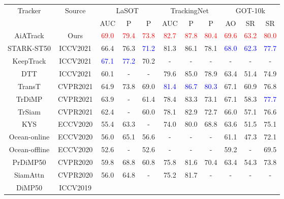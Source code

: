 \documentclass[runningheads]{llncs}
\begin{document}
\begin{table}[t]
\centering
\begin{tabular}{c|c|ccc|ccc|ccc}
\hline
\multirow{2}{*}{Tracker}
& \multirow{2}{*}{Source}
& \multicolumn{3}{c|}{LaSOT \cite{fan2019lasot}}
& \multicolumn{3}{c|}{TrackingNet \cite{muller2018trackingnet}}
& \multicolumn{3}{c}{GOT-10k \cite{huang2019got}} \\
& & AUC & P & \multicolumn{1}{c|}{P}
& AUC & P & \multicolumn{1}{c|}{P}
& AO & SR & SR \\
\hline
AiATrack & Ours & 
\textcolor{red}{69.0} & \textcolor{red}{79.4} & \textcolor{red}{73.8} & 
\textcolor{red}{82.7} & \textcolor{red}{87.8} & \textcolor{red}{80.4} & 
\textcolor{red}{69.6} & \textcolor{red}{63.2} & \textcolor{red}{80.0} \\
STARK-ST50 \cite{yan2021learning} & ICCV2021 & 
66.4 & 76.3 & \textcolor{blue}{71.2} & 81.3 & 86.1 & 78.1 & \textcolor{blue}{68.0} & \textcolor{blue}{62.3} & \textcolor{blue}{77.7} \\
KeepTrack \cite{mayer2021learning} & ICCV2021 & 
\textcolor{blue}{67.1} & \textcolor{blue}{77.2} & 70.2 & - & - & - & - & - & - \\
DTT \cite{yu2021high} & ICCV2021 & 
60.1 & - & - & 79.6 & 85.0 & 78.9 & 63.4 & 51.4 & 74.9 \\
TransT \cite{chen2021transformer} & CVPR2021 & 
64.9 & 73.8 & 69.0 & \textcolor{blue}{81.4} & \textcolor{blue}{86.7} & \textcolor{blue}{80.3} & 67.1 & 60.9 & 76.8 \\
TrDiMP \cite{wang2021transformer} & CVPR2021 & 
63.9 & - & 61.4 & 78.4 & 83.3 & 73.1 & 67.1 & 58.3 & \textcolor{blue}{77.7} \\
TrSiam \cite{wang2021transformer} & CVPR2021 & 
62.4 & - & 60.0 & 78.1 & 82.9 & 72.7 & 66.0 & 57.1 & 76.6 \\
KYS \cite{bhat2020know} & ECCV2020 & 
55.4 & 63.3 & - & 74.0 & 80.0 & 68.8 & 63.6 & 51.5 & 75.1 \\
Ocean-online \cite{zhang2020ocean} & ECCV2020 & 
56.0 & 65.1 & 56.6 & - & - & - & 61.1 & 47.3 & 72.1 \\
Ocean-offline \cite{zhang2020ocean} & ECCV2020 & 
52.6 & - & 52.6 & - & - & - & 59.2 & - & 69.5 \\
PrDiMP50 \cite{danelljan2020probabilistic} & CVPR2020 & 
59.8 & 68.8 & 60.8 & 75.8 & 81.6 & 70.4 & 63.4 & 54.3 & 73.8 \\
SiamAttn \cite{yu2020deformable} & CVPR2020 & 
56.0 & 64.8 & - & 75.2 & 81.7 & - & - & - & - \\
DiMP50 \cite{bhat2019learning} & ICCV2019 & 

\end{tabular}
\end{table}
\end{document}
